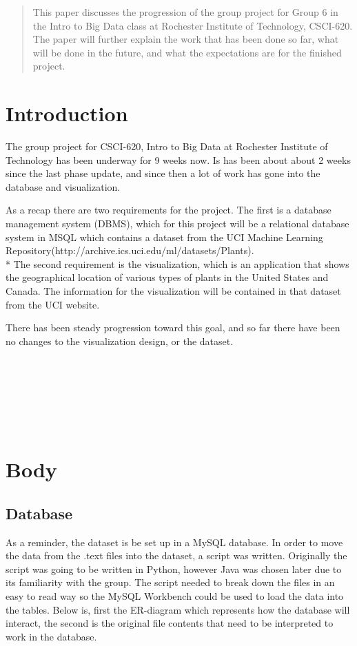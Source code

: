 \documentclass{Group6_Phase2}
\begin{document}
\maketitle
\begin{abstract}
This paper discusses the progression of the group project for Group 6 in the Intro to Big Data class at Rochester Institute of Technology, CSCI-620. The paper will further explain the work that has been done so far, what will be done in the future, and what the expectations are for the finished project. 
\end{abstract}


\section{Introduction}
The group project for CSCI-620, Intro to Big Data at Rochester Institute of Technology has been underway for 9 weeks now. Is has been about about 2 weeks since the last phase update, and since then a lot of work has gone into the database and visualization. 

As a recap there are two requirements for the project. The first is a database management system (DBMS), which for this project will be a relational database system in MSQL which contains a dataset from the UCI Machine Learning Repository(http://archive.ics.uci.edu/ml/datasets/Plants).\\* The second requirement is the visualization, which is an application that shows the geographical location of various types of plants in the United States and Canada. The information for the visualization will be contained in that dataset from the UCI website. 

There has been steady progression toward this goal, and so far there have been no changes to the visualization design, or the dataset. 
\\\\\\\\\\\\\\

\section{Body}

\subsection{Database}
As a reminder, the dataset is be set up in a MySQL database. In order to move the data from the .text files into the dataset, a script was written. Originally the script was going to be written in Python, however Java was chosen later due to its familiarity with the group. The script needed to break down the files in an easy to read way so the MySQL Workbench could be used to load the data into the tables. Below is, first the ER-diagram which represents how the database will interact, the second is the original file contents that need to be interpreted to work in the database. 
\end{document}
